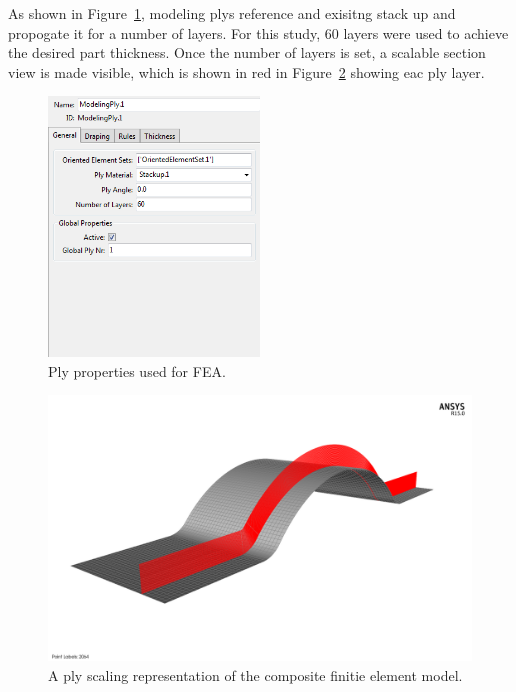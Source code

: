 As shown in Figure~\ref{fig:fea-acp-modeling-ply-properties}, modeling plys reference and exisitng stack up and propogate it for a number of layers. For this study, 60 layers were used to achieve the desired part thickness. Once the number of layers is set, a scalable section view is made visible, which is shown in red in Figure~\ref{fig:fea-acp-ply-scaling} showing eac ply layer.\\

\begin{figure}[htp]
\centering
\includegraphics[width=0.5\textwidth]{./figures/fea/fea-acp-modeling-ply-properties}
\caption{Ply properties used for FEA.}
\label{fig:fea-acp-modeling-ply-properties}
\end{figure}

\begin{figure}[htp]
\centering
\includegraphics[width=1\textwidth]{./figures/fea/fea-acp-ply-scaling}
\caption{A ply scaling representation of the composite finitie element model.}
\label{fig:fea-acp-ply-scaling}
\end{figure}

